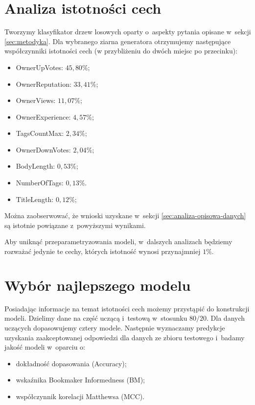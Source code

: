 \documentclass[12pt]{article}
\begin{document}
	\section{Analiza istotności cech}\label{sec:analiza-istotnosci-cech}
	Tworzymy klasyfikator drzew losowych oparty o~aspekty pytania opisane w~sekcji \ref{sec:metodyka}.
	Dla wybranego ziarna generatora otrzymujemy następujące współczynniki istotności cech (w przybliżeniu do dwóch miejsc po przecinku):
	\begin{itemize}
		\item OwnerUpVotes: $45,80\%$;
		\item OwnerReputation: $33,41\%$;
		\item OwnerViews: $11,07\%$;
		\item OwnerExperience: $4,57\%$;
		\item TagsCountMax: $2,34\%$;
		\item OwnerDownVotes: $2,04\%$;
		\item BodyLength: $0,53\%$;
		\item NumberOfTags: $0,13\%$.
		\item TitleLength: $0,12\%$;
	\end{itemize}
	Można zaobserwować, że wnioski uzyskane w~sekcji \ref{sec:analiza-opisowa-danych} są istotnie powiązane z~powyższymi wynikami.

	\vspace{0.25cm}

	Aby uniknąć przeparametryzowania modeli, w~dalszych analizach będziemy rozważać jedynie te cechy, których istotność wynosi przynajmniej $1\%$.

	\section{Wybór najlepszego modelu}\label{sec:wybor-najlepszego-modelu}
	Posiadając informacje na temat istotności cech możemy przystąpić do konstrukcji modeli.
	Dzielimy dane na część uczącą i~testową w~stosunku $80/20$.
	Dla danych uczących dopasowujemy cztery modele.
	Następnie wyznaczamy predykcje uzyskania zaakceptowanej odpowiedzi dla danych ze zbioru testowego i~badamy jakość modeli w~oparciu o:
	\begin{itemize}
		\item dokładność dopasowania (Accuracy);
		\item wskaźnika Bookmaker Informedness (BM);
		\item współczynnik korelacji Matthewsa (MCC).
	\end{itemize}
\end{document}
